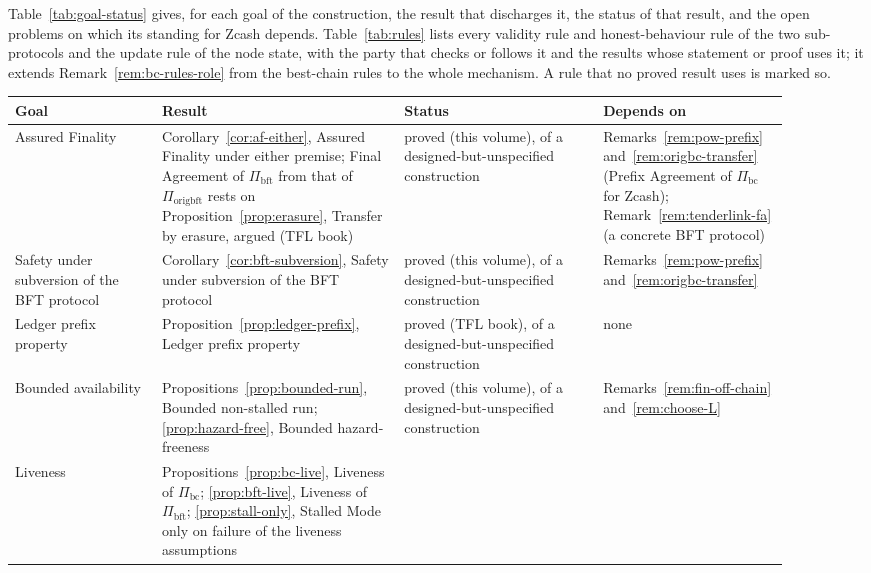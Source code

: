 \documentclass[11pt,a4paper]{article}
\theoremstyle{definition}
\newcommand{\bc}{\mathrm{bc}}
\newcommand{\bft}{\mathrm{bft}}
\newcommand{\Piorigbft}{\Pi_{\mathrm{origbft}}}
\newcommand{\Pibc}{\Pi_{\bc}}
\newcommand{\Pibft}{\Pi_{\bft}}
\begin{document}
Table~\ref{tab:goal-status} gives, for each goal of the construction, the
result that discharges it, the status of that result, and the open problems
on which its standing for Zcash depends. Table~\ref{tab:rules} lists every
validity rule and honest-behaviour rule of the two sub-protocols and the
update rule of the node state, with the party that checks or follows it and
the results whose statement or proof uses it; it extends
Remark~\ref{rem:bc-rules-role} from the best-chain rules to the whole
mechanism. A rule that no proved result uses is marked so.

\begin{table}[tbp]
\centering
\footnotesize \renewcommand{\arraystretch}{1.15}
\begin{tabular}{@{}p{0.17\linewidth}p{0.29\linewidth}p{0.23\linewidth}
  p{0.21\linewidth}@{}}
\toprule
Goal & Result & Status & Depends on \\
\midrule
Assured Finality
  & Corollary~\ref{cor:af-either}, Assured Finality under either premise;
  Final Agreement of $\Pibft$ from that of $\Piorigbft$ rests on
  Proposition~\ref{prop:erasure}, Transfer by erasure, argued (TFL book)
  & proved (this volume), of a designed-but-unspecified construction
  & Remarks~\ref{rem:pow-prefix} and~\ref{rem:origbc-transfer} (Prefix
  Agreement of $\Pibc$ for Zcash); Remark~\ref{rem:tenderlink-fa} (a
  concrete BFT protocol) \\
\addlinespace
Safety under subversion of the BFT protocol
  & Corollary~\ref{cor:bft-subversion}, Safety under subversion of the BFT
  protocol
  & proved (this volume), of a designed-but-unspecified construction
  & Remarks~\ref{rem:pow-prefix} and~\ref{rem:origbc-transfer} \\
\addlinespace
Ledger prefix property
  & Proposition~\ref{prop:ledger-prefix}, Ledger prefix property
  & proved (TFL book), of a designed-but-unspecified construction
  & none \\
\addlinespace
Bounded availability
  & Propositions~\ref{prop:bounded-run}, Bounded non-stalled run;
  \ref{prop:hazard-free}, Bounded hazard-freeness
  & proved (this volume), of a designed-but-unspecified construction
  & Remarks~\ref{rem:fin-off-chain} and~\ref{rem:choose-L} \\
\addlinespace
Liveness
  & Propositions~\ref{prop:bc-live}, Liveness of $\Pibc$;
  \ref{prop:bft-live}, Liveness of $\Pibft$; \ref{prop:stall-only}, Stalled
  Mode only on failure of the liveness assumptions

\end{tabular}
\end{table}
\end{document}
